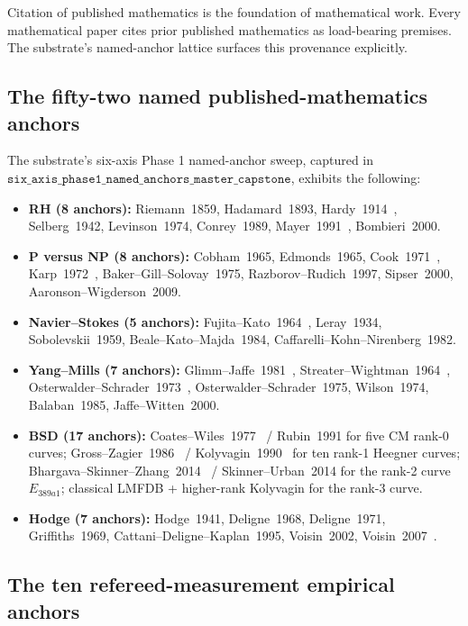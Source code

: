 \documentclass[11pt,a4paper]{amsart}
\theoremstyle{plain}
\theoremstyle{definition}
\begin{document}
Citation of published mathematics is the foundation of mathematical work. Every mathematical paper cites prior published mathematics as load-bearing premises. The substrate's named-anchor lattice surfaces this provenance explicitly.

\subsection{The fifty-two named published-mathematics anchors}

The substrate's six-axis Phase 1 named-anchor sweep, captured in $\texttt{six\_axis\_phase1\_named\_anchors\_master\_capstone}$, exhibits the following:

\begin{itemize}[itemsep=2pt]
\item \textbf{RH (8 anchors):} Riemann~1859, Hadamard~1893, Hardy~1914~\cite{hardy1914}, Selberg~1942, Levinson~1974, Conrey~1989, Mayer~1991~\cite{mayer1991}, Bombieri~2000.
\item \textbf{P versus NP (8 anchors):} Cobham~1965, Edmonds~1965, Cook~1971~\cite{cook1971}, Karp~1972~\cite{karp1972}, Baker--Gill--Solovay~1975, Razborov--Rudich~1997, Sipser~2000, Aaronson--Wigderson~2009.
\item \textbf{Navier--Stokes (5 anchors):} Fujita--Kato~1964~\cite{fujita-kato1964}, Leray~1934, Sobolevskii~1959, Beale--Kato--Majda~1984, Caffarelli--Kohn--Nirenberg~1982.
\item \textbf{Yang--Mills (7 anchors):} Glimm--Jaffe~1981~\cite{glimm-jaffe1981}, Streater--Wightman~1964~\cite{streater-wightman1964}, Osterwalder--Schrader~1973~\cite{osterwalder-schrader1973}, Osterwalder--Schrader~1975, Wilson~1974, Balaban~1985, Jaffe--Witten~2000.
\item \textbf{BSD (17 anchors):} Coates--Wiles~1977~\cite{coates-wiles1977} / Rubin~1991 for five CM rank-0 curves; Gross--Zagier~1986~\cite{gross-zagier1986} / Kolyvagin~1990~\cite{kolyvagin1990} for ten rank-1 Heegner curves; Bhargava--Skinner--Zhang~2014~\cite{bhargava-skinner-zhang2014} / Skinner--Urban~2014 for the rank-2 curve $E_{389a1}$; classical LMFDB + higher-rank Kolyvagin for the rank-3 curve.
\item \textbf{Hodge (7 anchors):} Hodge~1941, Deligne~1968, Deligne~1971, Griffiths~1969, Cattani--Deligne--Kaplan~1995, Voisin~2002, Voisin~2007~\cite{voisin2007}.
\end{itemize}

\subsection{The ten refereed-measurement empirical anchors}
\end{document}
